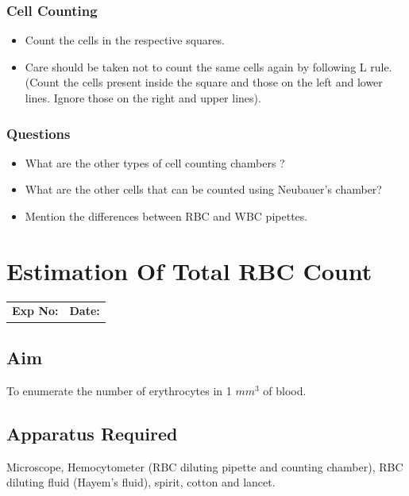 \documentclass[a4paper,12pt]{book}
\begin{document}
	\subsection*{Cell Counting}
	\begin{itemize}

		\item{	 Count the cells in the respective squares.}
		\item{	 Care should be taken not to count the same cells again by following L rule. (Count the cells present inside the square and those on the left and lower lines. Ignore those on the right and upper lines).}
	\end{itemize}

	\subsection*{Questions}

	\begin{itemize}

		\item{	 What are the other types of cell counting chambers ?}

		\item{	 What are the other cells that can be counted using Neubauer’s chamber?}
		\item{	 Mention the differences between RBC and WBC pipettes.}
	\end{itemize}

\chapter*{\centering Estimation Of Total RBC Count}

		\begin{tabular}{p{5in} p{1in}}
			\textbf{Exp No:}  & \textbf{Date:}\\
		\end{tabular}

		\section*{Aim}

		 To enumerate the number of  erythrocytes in 1 $mm^3$ of blood.
		\section*{Apparatus Required}
		Microscope, Hemocytometer (RBC diluting pipette and counting chamber), RBC diluting fluid (Hayem’s fluid), spirit, cotton and lancet.
\end{document}

